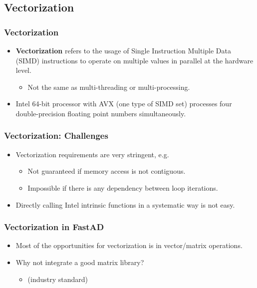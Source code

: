 \subsection{Vectorization}
\frame{\tableofcontents[currentsubsection]}

\begin{frame}
\frametitle{Vectorization}
\begin{itemize}

\item \textbf{Vectorization} refers to the usage of Single Instruction Multiple Data (SIMD) instructions
    to operate on multiple values in parallel at the hardware level.
    \begin{itemize}
        \item Not the same as multi-threading or multi-processing.
    \end{itemize}

\item Intel 64-bit processor with AVX (one type of SIMD set) processes 
    four double-precision floating point numbers simultaneously.

\end{itemize}
\end{frame}

\begin{frame}
\frametitle{Vectorization: Challenges}
\begin{itemize}

\item Vectorization requirements are very stringent, e.g.
    \begin{itemize}
        \item Not guaranteed if memory access is not contiguous.
        \item Impossible if there is any dependency between loop iterations.
    \end{itemize}

\item Directly calling Intel intrinsic functions in a systematic way is not easy.

\end{itemize}
\end{frame}

\begin{frame}
\frametitle{Vectorization in FastAD}
\begin{itemize}

\item Most of the opportunities for vectorization is in vector/matrix operations.
\item Why not integrate a good matrix library? 
    \begin{itemize}
        \item {} (industry standard)
    \end{itemize}

\end{itemize}
\end{frame}

